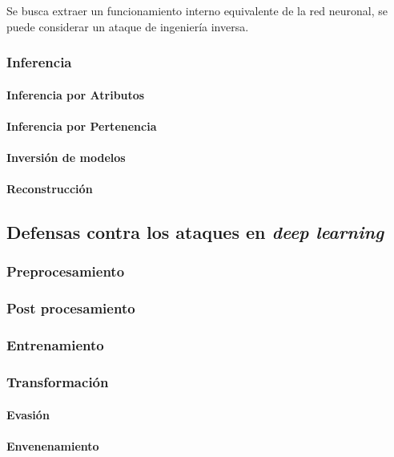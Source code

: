 Se busca extraer un funcionamiento interno equivalente de la red neuronal, se puede considerar un ataque de ingeniería inversa.

% 
\subsubsection{Inferencia}

\paragraph{Inferencia por Atributos}
\paragraph{Inferencia por Pertenencia}
\paragraph{Inversión de modelos}
\paragraph{Reconstrucción}


\subsection{Defensas contra los ataques en \textit{deep learning}}

\subsubsection{Preprocesamiento}
\subsubsection{Post procesamiento}
\subsubsection{Entrenamiento}
\subsubsection{Transformación}
\paragraph{Evasión}
\paragraph{Envenenamiento}
